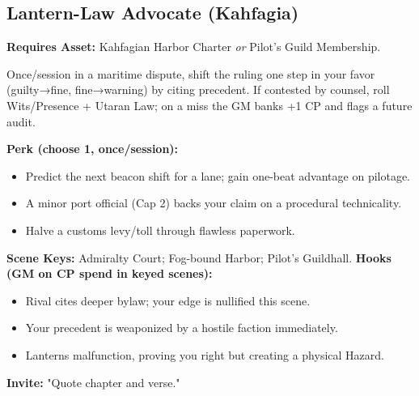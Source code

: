 \subsection{Lantern-Law Advocate (Kahfagia)}
\textbf{Requires Asset:} Kahfagian Harbor Charter \emph{or} Pilot's Guild Membership.
\begin{tcolorbox}[enhanced,sharp corners,boxrule=.6pt,title={Talent — Jurisdiction on the Tide (5 XP)}]
Once/session in a maritime dispute, shift the ruling one step in your favor (guilty→fine, fine→warning) by citing precedent. If contested by counsel, roll Wits/Presence + Utaran Law; on a miss the GM banks +1 CP and flags a future audit.
\end{tcolorbox}
\textbf{Perk (choose 1, once/session):}
\begin{itemize}
  \item Predict the next beacon shift for a lane; gain one-beat advantage on pilotage.
  \item A minor port official (Cap 2) backs your claim on a procedural technicality.
  \item Halve a customs levy/toll through flawless paperwork.
\end{itemize}
\textbf{Scene Keys:} Admiralty Court; Fog-bound Harbor; Pilot's Guildhall.
\textbf{Hooks (GM on CP spend in keyed scenes):}
\begin{itemize}
  \item Rival cites deeper bylaw; your edge is nullified this scene.
  \item Your precedent is weaponized by a hostile faction immediately.
  \item Lanterns malfunction, proving you right but creating a physical Hazard.
\end{itemize}
\textbf{Invite:} "Quote chapter and verse."


